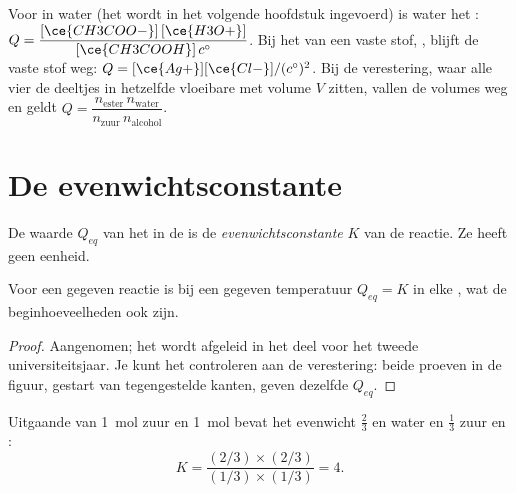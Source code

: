 \begin{example}\label{ex:g12:equilibrium:quotients}
Voor  in water (het  
wordt in het volgende hoofdstuk ingevoerd) is water het :
$Q = \dfrac{[\ce{CH3COO-}]\,[\ce{H3O+}]}{[\ce{CH3COOH}]\,c^\circ}$. Bij het
 van een vaste stof, , blijft de vaste
stof weg:
$Q = [\ce{Ag+}][\ce{Cl-}]/(c^\circ)^2$. Bij de verestering, waar alle vier
de deeltjes in hetzelfde vloeibare  met volume $V$ zitten, vallen de
volumes weg en geldt $Q = \dfrac{n_{\text{ester}}\, n_{\text{water}}}{n_{\text{zuur}}\, n_{\text{alcohol}}}$.
\end{example}

\section{De evenwichtsconstante}

\begin{definition}[Evenwichtsconstante]\label{def:g12:equilibrium:constant}
De waarde $Q_{eq}$ van het  in de  is de
\emph{evenwichtsconstante} $K$ van de reactie.
Ze heeft geen eenheid.
\end{definition}

\begin{proposition}\label{prop:g12:equilibrium:constant}
Voor een gegeven reactie is bij een gegeven temperatuur $Q_{eq} = K$ in
elke , wat de beginhoeveelheden ook zijn.
\end{proposition}

\begin{proof}
Aangenomen; het wordt afgeleid in het deel voor het tweede
universiteitsjaar. Je kunt het controleren aan de verestering: beide
proeven in de figuur, gestart van tegengestelde kanten, geven dezelfde
$Q_{eq}$.
\end{proof}

\begin{example}\label{ex:g12:equilibrium:k-ester}
Uitgaande van \qty{1}{mol} zuur en \qty{1}{mol}  bevat het
evenwicht $\frac{2}{3}$   en water en $\frac{1}{3}$  zuur en
:
\[
  K = \frac{(2/3)\times(2/3)}{(1/3)\times(1/3)} = 4 .
\]
\end{example}

